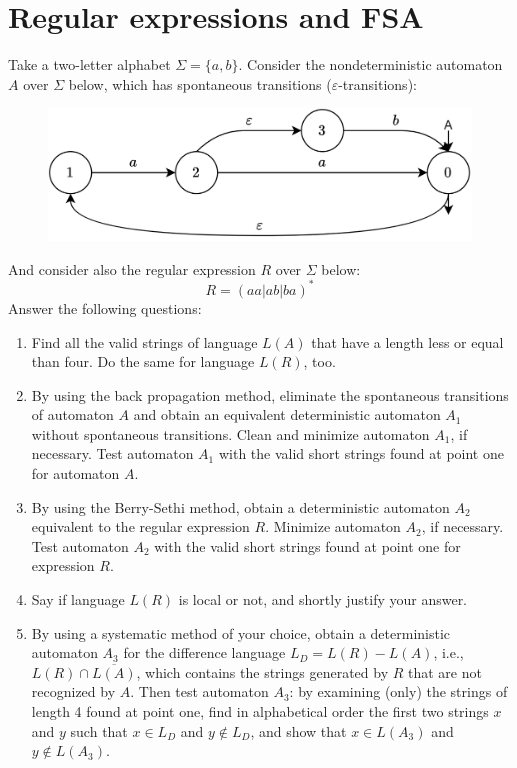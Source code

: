 \section{Regular expressions and FSA}

Take a two-letter alphabet $\Sigma=\{a,b\}$. 
Consider the nondeterministic automaton $A$ over $\Sigma$ below, which has spontaneous transitions ($\varepsilon$-transitions): 
\begin{figure}[H]
    \centering
    \includegraphics[width=0.5\linewidth]{images/FSA1a.png}
\end{figure}
And consider also the regular expression $R$ over $\Sigma$ below:
\[R=\left( aa|ab|ba \right)^{*}\]
Answer the following questions:
\begin{enumerate}
    \item Find all the valid strings of language $L(A)$ that have a length less or equal than four. 
        Do the same for language $L(R)$, too.
    \item By using the back propagation method, eliminate the spontaneous transitions of automaton $A$ and obtain an equivalent deterministic automaton $A_1$ without spontaneous transitions. 
        Clean and minimize automaton $A_1$, if necessary. 
        Test automaton $A_1$ with the valid short strings found at point one for automaton $A$. 
    \item By using the Berry-Sethi method, obtain a deterministic automaton $A_2$ equivalent to the regular expression $R$. 
        Minimize automaton $A_2$, if necessary. 
        Test automaton $A_2$ with the valid short strings found at point one for expression $R$.
    \item Say if language $L(R)$ is local or not, and shortly justify your answer.
    \item By using a systematic method of your choice, obtain a deterministic automaton $A_3$ for the difference language $L_D=L(R)-L(A)$, i.e., $L(R) \cap \overline{L(A)}$, which contains the strings generated by $R$ that are not recognized by $A$. 
        Then test automaton $A_3$: by examining (only) the strings of length 4 found at point one, find in alphabetical order the first two strings $x$ and $y$ such that $x \in L_D$ and $y \notin L_D$, and show that $x \in L(A_3)$ and $y \notin L(A_3)$.
\end{enumerate}

